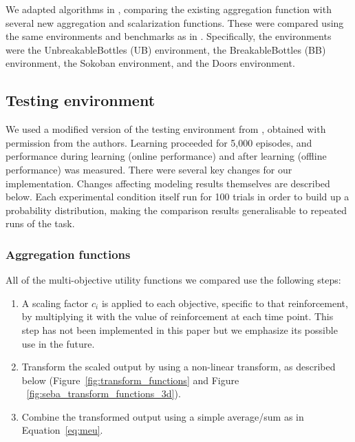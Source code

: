 We adapted algorithms in \cite{vamplew_potential-based_2021}, comparing the existing \tloA{} aggregation function with several new aggregation and scalarization functions. These were compared using the same environments and benchmarks as in \cite{vamplew_potential-based_2021}. Specifically, the environments were the UnbreakableBottles (UB) environment, the BreakableBottles (BB) environment, the Sokoban environment, and the Doors environment.
\subsection{Testing environment}

We used a modified version of the testing environment from \cite{vamplew_potential-based_2021}, obtained with permission from the authors. Learning proceeded for 5,000 episodes, and performance during learning (online performance) and after learning (offline performance) was measured. There were several key changes for our implementation. Changes affecting modeling results themselves are described below. Each experimental condition itself run for 100 trials in order to build up a probability distribution, making the comparison results generalisable to repeated runs of the task.



\subsubsection{Aggregation functions}



All of the multi-objective utility functions we compared use the following steps: 
\begin{enumerate}
    \item %
    A scaling factor $c_i$ is applied to each objective, specific to that reinforcement, by multiplying it with the value of reinforcement at each time point. This step has not been implemented in this paper but we emphasize its possible use in the future. 
    \item Transform the scaled output by using a non-linear transform, as described below (Figure~\ref{fig:transform_functions} and Figure ~\ref{fig:seba_transform_functions_3d}). %
    
    \item Combine the transformed output using a simple average/sum as in Equation~\ref{eq:meu}.
\end{enumerate}

